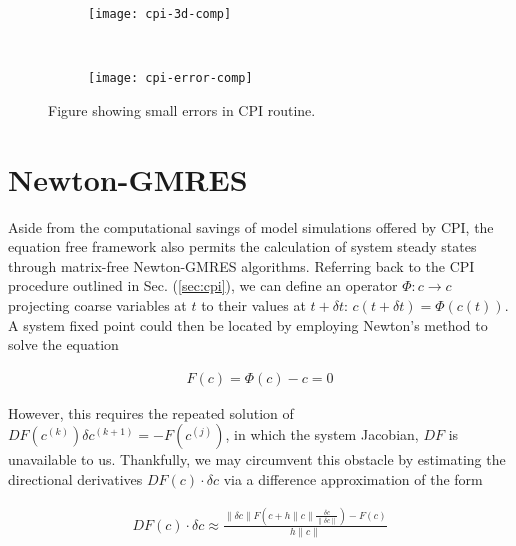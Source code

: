 \documentclass[epjST, final]{svjour}
\begin{document}
\begin{onehalfspace}
\begin{figure}[h!]
  \vspace{-5mm}
  \centering
  \begin{subfigure}{0.75\textwidth}
    \centering
    \texttt{[image: cpi-3d-comp]}
  \end{subfigure} \\ %
  \begin{subfigure}{0.75\textwidth}
    \centering
    \texttt{[image: cpi-error-comp]}
  \end{subfigure}%
  \caption{Figure showing small errors in CPI routine. \label{fig:cpi-results}}
\end{figure}


\section{Newton-GMRES}

Aside from the computational savings of model simulations offered by CPI, the equation free framework also permits the calculation of system steady states through matrix-free Newton-GMRES algorithms. Referring back to the CPI procedure outlined in Sec. (\ref{sec:cpi}), we can define an operator $\Phi: c \rightarrow c$ projecting coarse variables at $t$ to their values at $t + \delta t$: $c(t+\delta t) =\Phi(c(t))$. A system fixed point could then be located by employing Newton's method to solve the equation

\begin{align}
\label{eq:f}
F(c) = \Phi(c) - c = 0
\end{align}

However, this requires the repeated solution of $DF(c^{(k)}) \delta c^{(k+1)} = -F(c^{(j)})$, in which the system Jacobian, $DF$ is unavailable to us. Thankfully, we may circumvent this obstacle by estimating the directional derivatives $DF(c) \cdot \delta c$ via a difference approximation of the form

\begin{align}
  DF(c) \cdot \delta c \approx \frac{\| \delta c \| F(c + h \| c \| \frac{\delta c}{\| \delta c \|}) - F(c)}{h \| c \|}
\end{align}


\end{onehalfspace}
\end{document}
